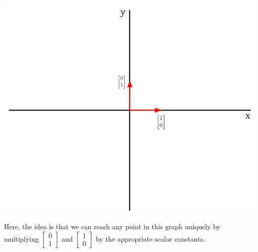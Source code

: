 \documentclass[letterpaper]{article}
\begin{document}
\begin{center}
    \includegraphics[scale=0.7]{../assets/r2.png}
\end{center}
Here, the idea is that we can reach any point in this graph uniquely by multiplying $\begin{bmatrix}
    0 \\ 1
\end{bmatrix}$ and $\begin{bmatrix}
    1 \\ 0
\end{bmatrix}$ by the appropriate scalar constants. 
\end{document}
